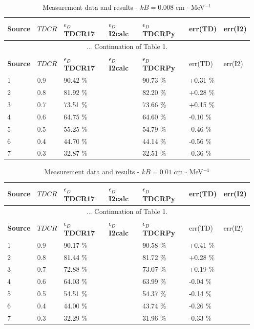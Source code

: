 \documentclass[12pt]{iopart}
\begin{document}
\begingroup
\footnotesize
\begin{longtable}[l]{| p{} | p{} |p{} |p{} |p{} |p{} |p{} |} 
\caption{Measurement data and results - $kB = 0.008$ cm $\cdot$ MeV$^{-1}$}
\label{Table1} \\ 
\hline
\textbf{Source} & \textbf{$TDCR$} & \textbf{$\epsilon_{D}$ TDCR17} & \textbf{$\epsilon_{D}$ I2calc} & \textbf{$\epsilon_{D}$ TDCRPy} & err(TD)& err(I2) \\
\endfirsthead
\multicolumn{7}{c}{... Continuation of Table 1.}\\ 
\hline
 \textbf{Source} & \textbf{$TDCR$} & \textbf{$\epsilon_{D}$ TDCR17} & \textbf{$\epsilon_{D}$ I2calc} & \textbf{$\epsilon_{D}$ TDCRPy} & err(TD)& err(I2) \\   \hline 
\endhead
\hline
 1 & 0.9   &   90.42 \% &  & 90.73 \% &  +0.31 \% & \\
 2 & 0.8   &   81.92 \% &  & 82.20 \% &  +0.28 \% & \\
 3 & 0.7   &   73.51 \% &  & 73.66 \% &  +0.15 \% & \\
 4 & 0.6   &   64.75 \% &  & 64.60 \% &  -0.10 \% & \\
 5 & 0.5   &   55.25 \% &  & 54.79 \% &  -0.46 \% & \\
 6 & 0.4   &   44.70 \% &  & 44.14 \% &  -0.56 \% & \\
 7 & 0.3   &   32.87 \% &  & 32.51 \% &  -0.36 \% & \\
\hline
\end{longtable} 
\endgroup

\begingroup
\footnotesize
\begin{longtable}[l]{| p{} | p{} |p{} | p{} |p{} |p{} |p{} |} 
\caption{Measurement data and results - $kB = 0.01$ cm $\cdot$ MeV$^{-1}$}
\label{Table1} \\ 
\hline
\textbf{Source} & \textbf{$TDCR$} & \textbf{$\epsilon_{D}$ TDCR17} & \textbf{$\epsilon_{D}$ I2calc} & \textbf{$\epsilon_{D}$ TDCRPy} & err(TD)& err(I2) \\ 
\endfirsthead
\multicolumn{7}{c}{... Continuation of Table 1.}\\ 
\hline
 \textbf{Source} & \textbf{$TDCR$} & \textbf{$\epsilon_{D}$ TDCR17} & \textbf{$\epsilon_{D}$ I2calc} & \textbf{$\epsilon_{D}$ TDCRPy} & err(TD)& err(I2) \\   \hline 
\endhead
\hline
 1 &  0.9  &  90.17 \% &  & 90.58 \% &  +0.41 \% & \\
 2 &  0.8  &  81.44 \% &  & 81.72 \% &  +0.28 \% & \\
 3 &  0.7  &  72.88 \% &  & 73.07 \% &  +0.19 \% & \\
 4 &  0.6  &  64.03 \% &  & 63.99 \% &  -0.04 \% & \\
 5 &  0.5  &  54.51 \% &  & 54.37 \% &  -0.14 \% & \\
 6 &  0.4  &  44.00 \% &  & 43.74 \% &  -0.26 \% & \\
 7 &  0.3  &  32.29 \% &  & 31.96 \% &  -0.33 \% & \\
\hline
\end{longtable} 
\endgroup
\end{document}
